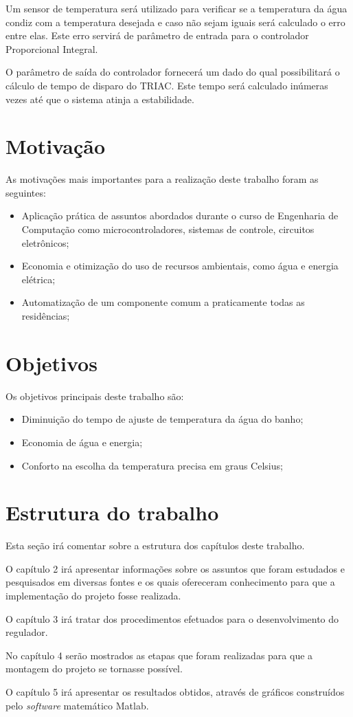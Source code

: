     Um sensor de temperatura será utilizado para verificar se a temperatura da água condiz com a temperatura desejada e caso não sejam iguais será calculado o erro entre elas. Este erro servirá de parâmetro de entrada para o controlador Proporcional Integral.
    
    O parâmetro de saída do controlador fornecerá um dado  do qual possibilitará o cálculo de tempo de disparo do TRIAC. Este tempo será calculado inúmeras vezes até que o sistema atinja a estabilidade.
    
\section{Motivação}
As motivações mais importantes para a realização deste trabalho foram as seguintes:
\begin{itemize}
\item Aplicação prática de assuntos abordados durante o curso de Engenharia de Computação como microcontroladores, sistemas de controle, circuitos eletrônicos;
\item Economia e otimização do uso de recursos ambientais, como água e energia elétrica;
\item Automatização de um componente comum a praticamente todas as residências;
\end{itemize}

\section{Objetivos}

Os objetivos principais deste trabalho são:

\begin{itemize}
\item Diminuição do tempo de ajuste de temperatura da água do banho;
\item Economia de água e energia;
\item Conforto na escolha da temperatura precisa em graus Celsius;
\end{itemize}


\section{Estrutura do trabalho}

Esta seção irá comentar sobre a estrutura dos capítulos deste trabalho.

    O capítulo 2 irá apresentar informações sobre os assuntos que foram estudados e pesquisados em diversas fontes e os quais ofereceram conhecimento para que a implementação do projeto fosse realizada.
    
    O capítulo 3 irá tratar dos procedimentos efetuados para o desenvolvimento do regulador.
    
    No capítulo 4 serão mostrados as etapas que foram realizadas para que a montagem do projeto se tornasse possível.
    
    O capítulo 5 irá apresentar os resultados obtidos, através de gráficos construídos pelo \textit{software} matemático Matlab.

    

